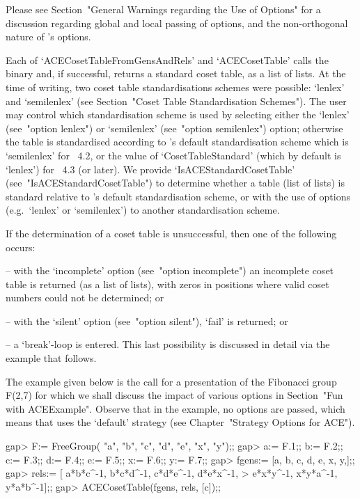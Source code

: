 Please see Section~"General Warnings regarding the Use of Options" for
a discussion regarding global and local passing of  options,  and  the
non-orthogonal nature of {\ACE}'s options.

Each of `ACECosetTableFromGensAndRels' and `ACECosetTable'  calls  the
{\ACE} binary and, if successful, returns a standard coset table, as a
{\GAP} list of  lists.  At  the  time  of  writing,  two  coset  table
standardisations schemes were possible: `lenlex' and `semilenlex' (see
Section~"Coset Table Standardisation Schemes"). The user  may  control
which standardisation scheme is used by selecting either the  `lenlex'
(see~"option  lenlex")  or  `semilenlex'   (see~"option   semilenlex")
option; otherwise the table  is  standardised  according  to  {\GAP}'s
default standardisation scheme which is `semilenlex'  for  {\GAP}~4.2,
or the value of `CosetTableStandard' (which by  default  is  `lenlex')
for  {\GAP}~4.3  (or  later).  We  provide   `IsACEStandardCosetTable'
(see~"IsACEStandardCosetTable") to determine whether a table (list  of
lists)  is  standard  relative  to  {\GAP}'s  default  standardisation
scheme, or with the use of options (e.g.~`lenlex' or `semilenlex')  to
another standardisation scheme.

If the determination of a coset table is unsuccessful, then one of the
following occurs:

\beginlist

\item{--} with the `incomplete' option  (see~"option  incomplete")  an
incomplete coset table is returned (as a list of lists), with zeros in
positions where valid coset numbers could not be determined; or

\item{--} with the `silent' option (see~"option  silent"),  `fail'  is
returned; or

\item{--} a  `break'-loop  is  entered.  This  last   possibility   is
discussed in detail via the example that follows.

\endlist

The example given  below  is  the  call  for  a  presentation  of  the
Fibonacci group F(2,7) for  which  we  shall  discuss  the  impact  of
various options in Section~"Fun with ACEExample". Observe that in  the
example, no options are passed,  which  means  that  {\ACE}  uses  the
`default' strategy (see Chapter~"Strategy Options for ACE").

\beginexample
gap> F:= FreeGroup( "a", "b", "c", "d", "e", "x", "y");;
gap> a:= F.1;; b:= F.2;; c:= F.3;; d:= F.4;; e:= F.5;; x:= F.6;; y:= F.7;;
gap> fgens:= [a, b, c, d, e, x, y,];;
gap> rels:= [ a*b*c^-1, b*c*d^-1, c*d*e^-1, d*e*x^-1, 
>             e*x*y^-1, x*y*a^-1, y*a*b^-1];;
gap> ACECosetTable(fgens, rels, [c]);;
\endexample

